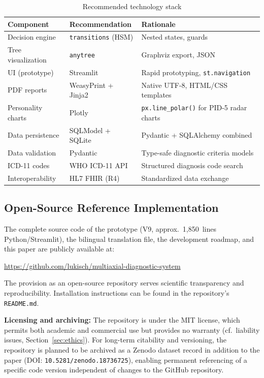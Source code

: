 \documentclass[11pt,a4paper]{article}
\begin{document}
\begin{table}[H]
\centering
\caption{Recommended technology stack}
\label{tab:techstack}
\begin{tabularx}{\textwidth}{lXl}
\toprule
\textbf{Component} & \textbf{Recommendation} & \textbf{Rationale} \\
\midrule
Decision engine & \texttt{transitions} (HSM) & Nested states, guards \\
Tree visualization & \texttt{anytree} & Graphviz export, JSON \\
UI (prototype) & Streamlit & Rapid prototyping, \texttt{st.navigation} \\
PDF reports & WeasyPrint + Jinja2 & Native UTF-8, HTML/CSS templates \\
Personality charts & Plotly & \texttt{px.line\_polar()} for PID-5 radar charts \\
Data persistence & SQLModel + SQLite & Pydantic + SQLAlchemy combined \\
Data validation & Pydantic & Type-safe diagnostic criteria models \\
ICD-11 codes & WHO ICD-11 API & Structured diagnosis code search \\
Interoperability & HL7 FHIR (R4) & Standardized data exchange \\
\bottomrule
\end{tabularx}
\end{table}

\subsection{Open-Source Reference Implementation}

The complete source code of the prototype (V9, approx.\ 1,850~lines Python/Streamlit), the bilingual translation file, the development roadmap, and this paper are publicly available at:

\begin{center}
\url{https://github.com/lukisch/multiaxial-diagnostic-system}
\end{center}

\noindent The provision as an open-source repository serves scientific transparency and reproducibility. Installation instructions can be found in the repository's \texttt{README.md}.

\textbf{Licensing and archiving:} The repository is under the MIT license, which permits both academic and commercial use but provides no warranty (cf.\ liability issues, Section~\ref{sec:ethics}). For long-term citability and versioning, the repository is planned to be archived as a Zenodo dataset record in addition to the paper (DOI: \texttt{10.5281/zenodo.18736725}), enabling permanent referencing of a specific code version independent of changes to the GitHub repository.
\end{document}
